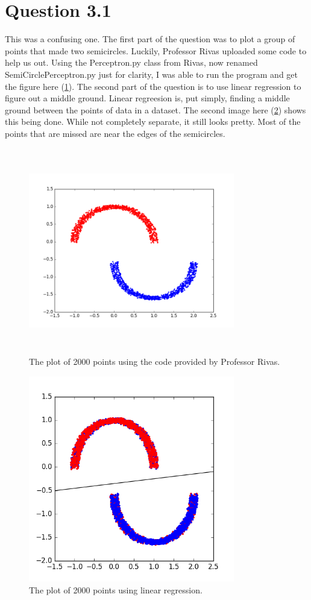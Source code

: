 \documentclass[a4paper]{article}
\begin{document}
\section{Question 3.1}
This was a confusing one. The first part of the question was to plot a group of points that made two semicircles. Luckily, Professor Rivas uploaded some code to help us out. Using the Perceptron.py class from Rivas, now renamed SemiCirclePerceptron.py just for clarity, I was able to run the program and get the figure here (\ref{fig:figure_3}). The second part of the question is to use linear regression to figure out a middle ground. Linear regreesion is, put simply, finding a middle ground between the points of data in a dataset. The second image here (\ref{fig:figure_1}) shows this being done. While not completely separate, it still looks pretty. Most of the points that are missed are near the edges of the semicircles.
\begin{figure}
  \includegraphics[width=9cm,height=9cm]{figure_3.png}
  \caption{The plot of 2000 points using the code provided by Professor Rivas.}
  \label{fig:figure_3}
\end{figure}
\begin{figure}
  \includegraphics[width=9cm,height=9cm]{figure_1.png}
  \caption{The plot of 2000 points using linear regression.}
  \label{fig:figure_1}
\end{figure}
\end{document}
